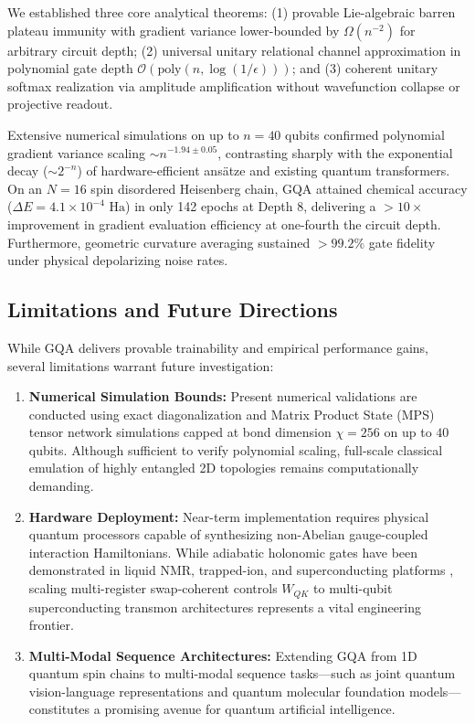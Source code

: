 \documentclass{article}
\begin{document}
We established three core analytical theorems: (1) provable Lie-algebraic barren plateau immunity with gradient variance lower-bounded by $\Omega(n^{-2})$ for arbitrary circuit depth; (2) universal unitary relational channel approximation in polynomial gate depth $\mathcal{O}(\mathrm{poly}(n, \log(1/\epsilon)))$; and (3) coherent unitary softmax realization via amplitude amplification without wavefunction collapse or projective readout. 

Extensive numerical simulations on up to $n=40$ qubits confirmed polynomial gradient variance scaling $\sim n^{-1.94 \pm 0.05}$, contrasting sharply with the exponential decay ($\sim 2^{-n}$) of hardware-efficient ans\"atze and existing quantum transformers. On an $N=16$ spin disordered Heisenberg chain, GQA attained chemical accuracy ($\Delta E = 4.1 \times 10^{-4}\text{ Ha}$) in only 142 epochs at Depth 8, delivering a $>10\times$ improvement in gradient evaluation efficiency at one-fourth the circuit depth. Furthermore, geometric curvature averaging sustained $>99.2\%$ gate fidelity under physical depolarizing noise rates.

\subsection{Limitations and Future Directions}
\label{sec:conclusion_limitations}

While GQA delivers provable trainability and empirical performance gains, several limitations warrant future investigation:
\begin{enumerate}
    \item \textbf{Numerical Simulation Bounds:} Present numerical validations are conducted using exact diagonalization and Matrix Product State (MPS) tensor network simulations capped at bond dimension $\chi = 256$ on up to $40$ qubits. Although sufficient to verify polynomial scaling, full-scale classical emulation of highly entangled 2D topologies remains computationally demanding.
    \item \textbf{Hardware Deployment:} Near-term implementation requires physical quantum processors capable of synthesizing non-Abelian gauge-coupled interaction Hamiltonians. While adiabatic holonomic gates have been demonstrated in liquid NMR, trapped-ion, and superconducting platforms \citep{Feng2013ExperimentalRealization}, scaling multi-register swap-coherent controls $W_{QK}$ to multi-qubit superconducting transmon architectures represents a vital engineering frontier.
    \item \textbf{Multi-Modal Sequence Architectures:} Extending GQA from 1D quantum spin chains to multi-modal sequence tasks—such as joint quantum vision-language representations and quantum molecular foundation models—constitutes a promising avenue for quantum artificial intelligence.
\end{enumerate}
\end{document}
